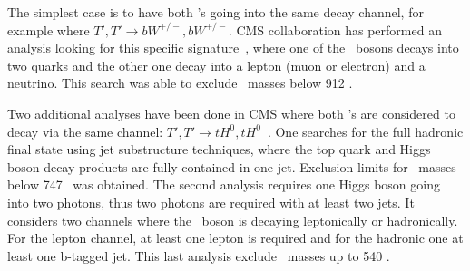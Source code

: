 The simplest case is to have both \Tp's going into the same decay channel, for example where ${T',T'\rightarrow bW^{+/-},bW^{+/-}}$. CMS collaboration has performed an analysis looking for this specific signature~\cite{CMS-PAS-B2G-12-017}, where one of the \W~bosons decays into two quarks and the other one decay into a lepton (muon or electron) and a neutrino. This search was able to exclude \Tp~masses below 912 \GeVcc.
%

Two additional analyses have been done in CMS where both \Tp's are considered to decay via the same channel: ${T',T'\rightarrow tH^{0},tH^{0}}$~\cite{Khachatryan:2015axa,CMS-PAS-B2G-14-003}. One searches for the full hadronic final state using jet substructure techniques, where the top quark and Higgs boson decay products are fully contained in one jet. Exclusion limits for \Tp~masses below 747 \GeVcc~was obtained. The second analysis requires one Higgs boson going into two photons, thus two photons are required with at least two jets. It considers two channels where the \W~boson is decaying leptonically or hadronically. For the lepton channel, at least one lepton is required and for the hadronic one at least one b-tagged jet. This last analysis exclude \Tp~masses up to 540 \GeVcc.
%

